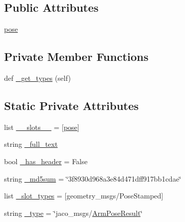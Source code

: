 \subsection*{Public Attributes}
\begin{DoxyCompactItemize}
\item 
\hyperlink{classjaco__msgs_1_1msg_1_1__ArmPoseResult_1_1ArmPoseResult_a1ecfceb51d3dc9aa38ea12a77158af38}{pose}
\end{DoxyCompactItemize}
\subsection*{Private Member Functions}
\begin{DoxyCompactItemize}
\item 
def \hyperlink{classjaco__msgs_1_1msg_1_1__ArmPoseResult_1_1ArmPoseResult_a8baa7608b16aaa206b7ab60a0f985905}{\+\_\+get\+\_\+types} (self)
\end{DoxyCompactItemize}
\subsection*{Static Private Attributes}
\begin{DoxyCompactItemize}
\item 
list \hyperlink{classjaco__msgs_1_1msg_1_1__ArmPoseResult_1_1ArmPoseResult_a974c8749a75a914c61bc78d2f57e719a}{\+\_\+\+\_\+slots\+\_\+\+\_\+} = \mbox{[}\textquotesingle{}\hyperlink{classjaco__msgs_1_1msg_1_1__ArmPoseResult_1_1ArmPoseResult_a1ecfceb51d3dc9aa38ea12a77158af38}{pose}\textquotesingle{}\mbox{]}
\item 
string \hyperlink{classjaco__msgs_1_1msg_1_1__ArmPoseResult_1_1ArmPoseResult_a24e6b6a07c8faf462fe7fcfa61d23627}{\+\_\+full\+\_\+text}
\item 
bool \hyperlink{classjaco__msgs_1_1msg_1_1__ArmPoseResult_1_1ArmPoseResult_a5700cf580a06a534210e6b74a41468b7}{\+\_\+has\+\_\+header} = False
\item 
string \hyperlink{classjaco__msgs_1_1msg_1_1__ArmPoseResult_1_1ArmPoseResult_a39a6952d01b43d62b16315cc27cb8988}{\+\_\+md5sum} = \char`\"{}3f8930d968a3e84d471dff917bb1cdae\char`\"{}
\item 
list \hyperlink{classjaco__msgs_1_1msg_1_1__ArmPoseResult_1_1ArmPoseResult_a6325d8d1d310280ededa87406216a7b4}{\+\_\+slot\+\_\+types} = \mbox{[}\textquotesingle{}geometry\+\_\+msgs/Pose\+Stamped\textquotesingle{}\mbox{]}
\item 
string \hyperlink{classjaco__msgs_1_1msg_1_1__ArmPoseResult_1_1ArmPoseResult_a2cc6c4935b92b9d8445917be183e2521}{\+\_\+type} = \char`\"{}jaco\+\_\+msgs/\hyperlink{classjaco__msgs_1_1msg_1_1__ArmPoseResult_1_1ArmPoseResult}{Arm\+Pose\+Result}\char`\"{}
\end{DoxyCompactItemize}


